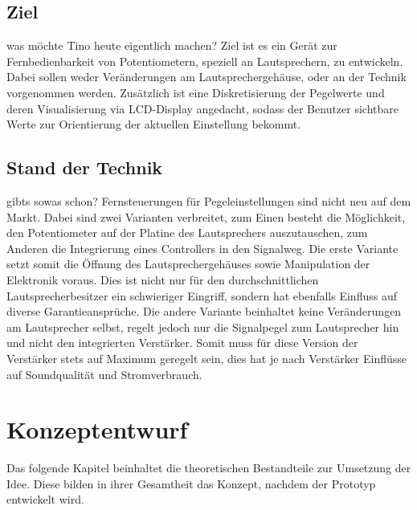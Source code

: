 \documentclass[11pt, titlepage]{report}
\begin{document}
	\section*{Ziel}
		was möchte Tino heute eigentlich machen?\newline
		Ziel ist es ein Gerät zur Fernbedienbarkeit von Potentiometern, speziell an Lautsprechern, zu entwickeln. Dabei sollen weder Veränderungen am Lautsprechergehäuse, oder an der Technik vorgenommen werden. Zusätzlich ist eine Diskretisierung der Pegelwerte und deren Visualisierung via LCD-Display angedacht, sodass der Benutzer sichtbare 
		Werte zur Orientierung der aktuellen Einstellung bekommt. 
	\section*{Stand der Technik}	
		gibts sowas schon?\newline
		Fernsteuerungen für Pegeleinstellungen sind nicht neu auf dem Markt. Dabei sind zwei Varianten verbreitet, zum Einen besteht die Möglichkeit, den Potentiometer auf der Platine des Lautsprechers auszutauschen, zum Anderen die Integrierung eines Controllers in den Signalweg. Die erste Variante setzt somit die Öffnung des Lautsprechergehäuses sowie Manipulation der Elektronik voraus. Dies ist nicht nur für den durchschnittlichen
		Lautsprecherbesitzer ein schwieriger Eingriff, sondern hat ebenfalls Einfluss auf diverse Garantieansprüche.\newline
		Die andere Variante beinhaltet keine Veränderungen am Lautsprecher selbst, regelt jedoch nur die Signalpegel zum Lautsprecher hin und nicht den integrierten Verstärker. Somit muss für diese Version der Verstärker stets auf Maximum geregelt sein, dies hat je nach Verstärker Einflüsse auf Soundqualität und Stromverbrauch.
	\chapter{Konzeptentwurf}
		Das folgende Kapitel beinhaltet die theoretischen Bestandteile zur Umsetzung der Idee. Diese bilden in ihrer Gesamtheit das Konzept,
		nachdem der Prototyp entwickelt wird.
\end{document}
